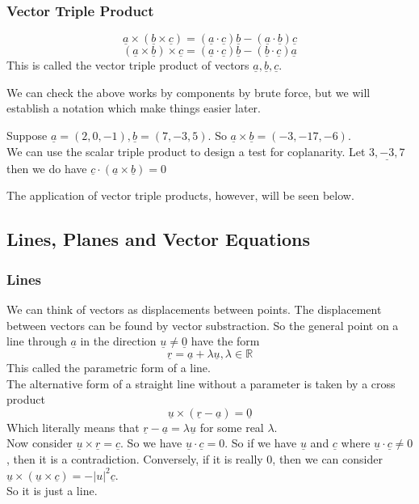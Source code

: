 \subsubsection{Vector Triple Product}
\begin{definition}
    $$\underline{a}\times(\underline{b}\times\underline{c})=(\underline{a}\cdot\underline{c})\underline{b}-(\underline{a}\cdot\underline{b})\underline{c}$$
    $$(\underline{a}\times\underline{b})\times\underline{c}=(\underline{a}\cdot\underline{c})\underline{b}-(\underline{b}\cdot\underline{c})\underline{a}$$
    This is called the vector triple product of vectors $\underline{a},\underline{b},\underline{c}$.
\end{definition}
We can check the above works by components by brute force, but we will establish a notation which make things easier later.
\begin{example}
    Suppose $\underline{a}=(2,0,-1),\underline{b}=(7,-3,5)$.
    So $\underline{a}\times\underline{b}=(-3,-17,-6)$.\\
    We can use the scalar triple product to design a test for coplanarity.
    Let $\underline{3,-3,7}$ then we do have $\underline{c}\cdot(\underline{a}\times\underline{b})=0$
\end{example}
The application of vector triple products, however, will be seen below. 
\subsection{Lines, Planes and Vector Equations}
\subsubsection{Lines}
We can think of vectors as displacements between points.
The displacement between vectors can be found by vector substraction.
So the general point on a line through $\underline{a}$ in the direction $\underline{u}\neq\underline{0}$ have the form
$$\underline{r}=\underline{a}+\lambda\underline{u},\lambda\in\mathbb R$$
This called the parametric form of a line.\\
The alternative form of a straight line without a parameter is taken by a cross product
$$\underline{u}\times(\underline{r}-\underline{a})=\underline{0}$$
Which literally means that $\underline{r}-\underline{a}=\lambda\underline{u}$ for some real $\lambda$.\\
Now consider $\underline{u}\times\underline{r}=\underline{c}$.
So we have $\underline{u}\cdot\underline{c}=0$.
So if we have $\underline{u}$ and $\underline{c}$ where $\underline{u}\cdot\underline{c}\neq 0$, then it is a contradiction.
Conversely, if it is really $0$, then we can consider $\underline{u}\times (\underline{u}\times\underline{c})=-|u|^2\underline{c}$.\\
So it is just a line.
